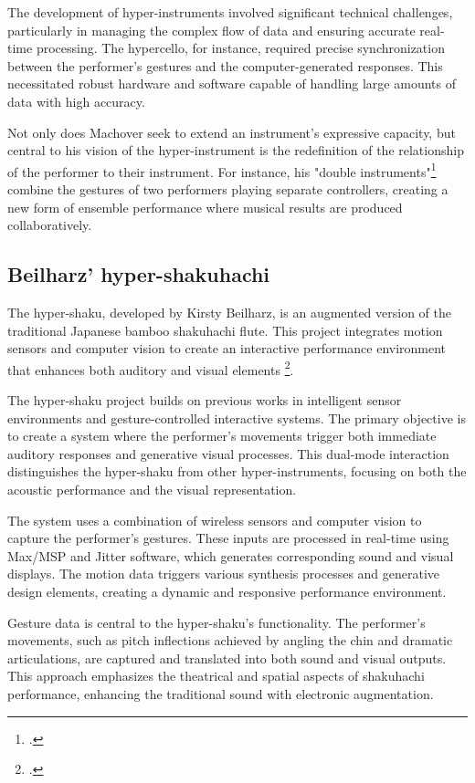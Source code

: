 \documentclass[12pt,twoside,maitrise]{dms_ks}
\theoremstyle{definition}
\begin{document}
{The development of hyper-instruments involved significant technical challenges, particularly in managing the complex flow of data and ensuring accurate real-time processing. 
The hypercello, for instance, required precise synchronization between the performer's gestures and the computer-generated responses. 
This necessitated robust hardware and software capable of handling large amounts of data with high accuracy.

Not only does Machover seek to extend an instrument's expressive capacity, but central to his vision of the hyper-instrument is the redefinition of the relationship of the performer to their instrument. 
For instance, his "double instruments"\footcite[189]{machover_hyper-instruments_1989} combine the gestures of two performers playing separate controllers, creating a new form of ensemble performance where musical results are produced collaboratively.

\subsection{Beilharz' hyper-shakuhachi}

The hyper-shaku, developed by Kirsty Beilharz, is an augmented version of the traditional Japanese bamboo shakuhachi flute. 
This project integrates motion sensors and computer vision to create an interactive performance environment that enhances both auditory and visual elements \footcite{beilharz_hyper-shaku_2006}. 

The hyper-shaku project builds on previous works in intelligent sensor environments and gesture-controlled interactive systems. 
The primary objective is to create a system where the performer's movements trigger both immediate auditory responses and generative visual processes. 
This dual-mode interaction distinguishes the hyper-shaku from other hyper-instruments, focusing on both the acoustic performance and the visual representation.

The system uses a combination of wireless sensors and computer vision to capture the performer's gestures. 
These inputs are processed in real-time using Max/MSP and Jitter software, which generates corresponding sound and visual displays. 
The motion data triggers various synthesis processes and generative design elements, creating a dynamic and responsive performance environment.

Gesture data is central to the hyper-shaku's functionality. 
The performer's movements, such as pitch inflections achieved by angling the chin and dramatic articulations, are captured and translated into both sound and visual outputs. 
This approach emphasizes the theatrical and spatial aspects of shakuhachi performance, enhancing the traditional sound with electronic augmentation.

}
\end{document}
